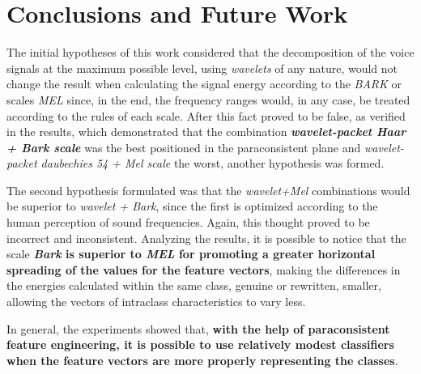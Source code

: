 \section{Conclusions and Future Work}
\label{sec:conclusions}
	\par The initial hypotheses of this work considered that the decomposition of the voice signals at the maximum possible level, using \textit{wavelets} of any nature, would not change the result when calculating the signal energy according to the \textit{BARK} or scales \textit{MEL} since, in the end, the frequency ranges would, in any case, be treated according to the rules of each scale. After this fact proved to be false, as verified in the results, which demonstrated that the combination \textbf{\textit{wavelet-packet Haar + Bark scale}} was the best positioned in the paraconsistent plane and \textit{wavelet-packet daubechies 54 + Mel scale} the worst, another hypothesis was formed.
	
	\par The second hypothesis formulated was that the \textit{wavelet+Mel} combinations would be superior to \textit{wavelet + Bark}, since the first is optimized according to the human perception of sound frequencies. Again, this thought proved to be incorrect and inconsistent. Analyzing the results, it is possible to notice that the scale \textbf{\textit{Bark} is superior to \textit{MEL} for promoting a greater horizontal spreading of the values for the feature vectors}, making the differences in the energies calculated within the same class, genuine or rewritten, smaller, allowing the vectors of intraclass characteristics to vary less.
	
	\par In general, the experiments showed that, \textbf{with the help of paraconsistent feature engineering, it is possible to use relatively modest classifiers when the feature vectors are more properly representing the classes}.
	
